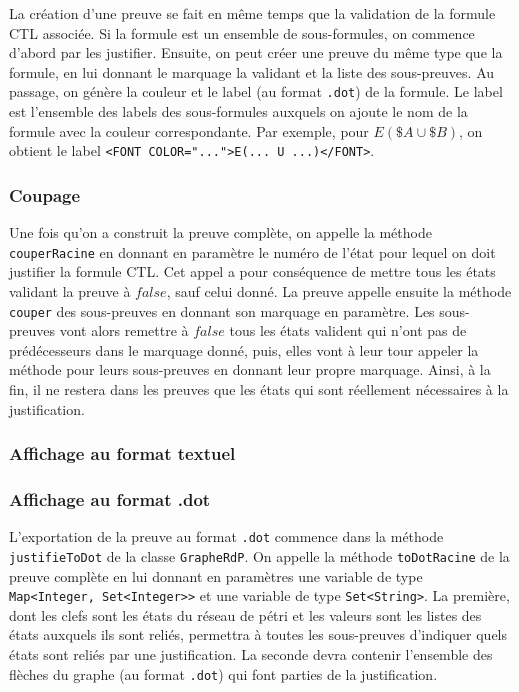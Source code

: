 \documentclass[dvipsnames]{report}
\begin{document}
La création d'une preuve se fait en même temps que la validation de la formule CTL associée. Si la formule est un ensemble de sous-formules, on commence d'abord par les justifier. Ensuite, on peut créer une preuve du même type que la formule, en lui donnant le marquage la validant et la liste des sous-preuves. Au passage, on génère la couleur et le label (au format \texttt{.dot}) de la formule. Le label est l'ensemble des labels des sous-formules auxquels on ajoute le nom de la formule avec la couleur correspondante. Par exemple, pour $E(\$A \cup \$B)$, on obtient le label \texttt{<FONT COLOR="...">E(... U ...)</FONT>}.

\subsubsection{Coupage}

Une fois qu'on a construit la preuve complète, on appelle la méthode \texttt{couperRacine} en donnant en paramètre le numéro de l'état pour lequel on doit justifier la formule CTL. Cet appel a pour conséquence de mettre tous les états validant la preuve à $false$, sauf celui donné. La preuve appelle ensuite la méthode \texttt{couper} des sous-preuves en donnant son marquage en paramètre. Les sous-preuves vont alors remettre à $false$ tous les états valident qui n'ont pas de prédécesseurs dans le marquage donné, puis, elles vont à leur tour appeler la méthode pour leurs sous-preuves en donnant leur propre marquage. Ainsi, à la fin, il ne restera dans les preuves que les états qui sont réellement nécessaires à la justification.

\subsubsection{Affichage au format textuel}

\subsubsection{Affichage au format .dot}

L'exportation de la preuve au format \texttt{.dot} commence dans la méthode \texttt{justifieToDot} de la classe \texttt{GrapheRdP}. On appelle la méthode \texttt{toDotRacine} de la preuve complète en lui donnant en paramètres une variable de type \texttt{Map<Integer, {Set<Integer>}>} et une variable de type \texttt{Set<String>}. La première, dont les clefs sont les états du réseau de pétri et les valeurs sont les listes des états auxquels ils sont reliés, permettra à toutes les sous-preuves d'indiquer quels états sont reliés par une justification. La seconde devra contenir l'ensemble des flèches du graphe (au format \texttt{.dot}) qui font parties de la justification.
\end{document}

